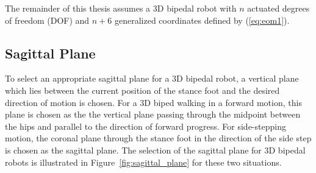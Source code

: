 The remainder of this thesis assumes a 3D bipedal robot with $n$ actuated degrees of freedom (DOF) and $n+6$ generalized coordinates defined by (\ref{eq:eom1}). 

\subsection{Sagittal Plane} %
\label{sub:sagittal_plane}
To select an appropriate sagittal plane for a 3D bipedal robot, a vertical plane which lies between the current position of the stance foot and the desired direction of motion is chosen. For a 3D biped walking in a forward motion, this plane is chosen as the the vertical plane passing through the midpoint between the hips and parallel to the direction of forward progress. For side-stepping motion, the coronal plane through the stance foot in the direction of the side step is chosen as the sagittal plane. The selection of the sagittal plane for 3D bipedal robots is illustrated in Figure~\ref{fig:sagittal_plane} for these two situations. 

